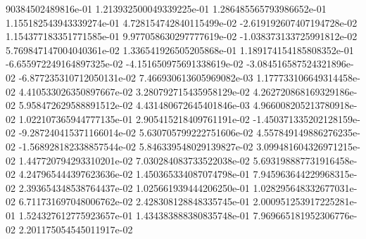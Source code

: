 90384502489816e-01	1.213932500049339225e-01	1.286485565793986652e-01	1.155182543943339274e-01	4.728154742840115499e-02	-2.619192607407194728e-02	1.154377183351771585e-01	9.977058630297777619e-02	-1.038373133725991812e-02	5.769847147004040361e-02	1.336541926505205868e-01	1.189174154185808352e-01	-6.655972249164897325e-02	-4.151650975691338619e-02	-3.084516587524321896e-02	-6.877235310712050131e-02	7.466930613605969082e-03	1.177733106649314458e-02	4.410533026350897667e-02	3.280792715435958129e-02	4.262720868169329186e-02	5.958472629588891512e-02	4.431480672645401846e-03	4.966008205213780918e-02	1.022107365944777135e-01	2.905415218409761191e-02	-1.450371335202128159e-02	-9.287240415371166014e-02	5.630705799222751606e-02	4.557849149886276235e-02	-1.568928182338857544e-02	5.846339548029139827e-02	3.099481604326971215e-02	1.447720794293310201e-02	7.030284083733522038e-02	5.693198887731916458e-02	4.247965444397623636e-02	1.450365334087074798e-01	7.945963644229968315e-02	2.393654348538764437e-02	1.025661939444206250e-01	1.028295648332677031e-02	6.711731697048006762e-02	2.428308128848335745e-01	2.000951253917225281e-01	1.524327612775923657e-01	1.434383888380835748e-01	7.969665181952306776e-02	2.201175054545011917e-02

